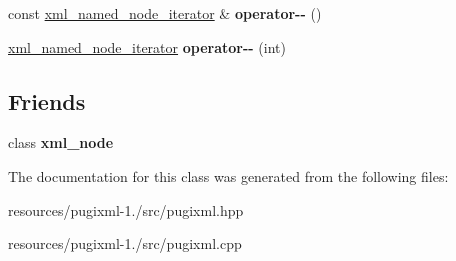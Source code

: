 \begin{DoxyCompactItemize}
\item 
\hypertarget{classpugi_1_1xml__named__node__iterator_aaee9df71be9b3a08f871cbf420d8384d}{const \hyperlink{classpugi_1_1xml__named__node__iterator}{xml\+\_\+named\+\_\+node\+\_\+iterator} \& {\bfseries operator-\/-\/} ()}\label{classpugi_1_1xml__named__node__iterator_aaee9df71be9b3a08f871cbf420d8384d}

\item 
\hypertarget{classpugi_1_1xml__named__node__iterator_af5b1c61a813276537774d60e32c6408c}{\hyperlink{classpugi_1_1xml__named__node__iterator}{xml\+\_\+named\+\_\+node\+\_\+iterator} {\bfseries operator-\/-\/} (int)}\label{classpugi_1_1xml__named__node__iterator_af5b1c61a813276537774d60e32c6408c}

\end{DoxyCompactItemize}
\subsection*{Friends}
\begin{DoxyCompactItemize}
\item 
\hypertarget{classpugi_1_1xml__named__node__iterator_a156d917a92815c7b593bd5ef19f6d5fb}{class {\bfseries xml\+\_\+node}}\label{classpugi_1_1xml__named__node__iterator_a156d917a92815c7b593bd5ef19f6d5fb}

\end{DoxyCompactItemize}


The documentation for this class was generated from the following files\+:\begin{DoxyCompactItemize}
\item 
resources/pugixml-\/1./src/pugixml.\+hpp\item 
resources/pugixml-\/1./src/pugixml.\+cpp\end{DoxyCompactItemize}
